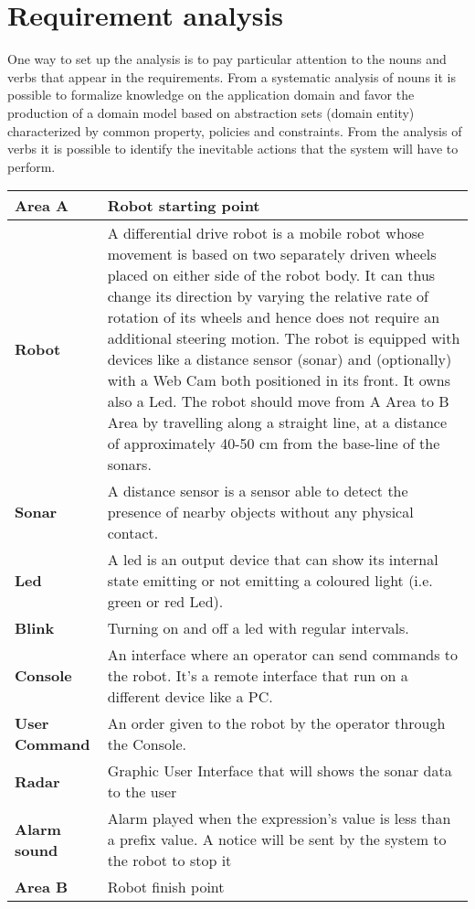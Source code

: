 \section{Requirement analysis}
One way to set up the analysis is to pay particular attention to the nouns and verbs that appear in the requirements. From a systematic analysis of nouns it is possible to formalize knowledge on the application domain and favor the production of a domain model based on abstraction sets (domain entity) characterized by common property, policies and constraints. From the analysis of verbs it is possible to identify the inevitable actions that the system will have to perform.
\begin{minipage}{\linewidth}
\centering
{} \label{tab:title} 
\end{minipage}
\begin{tabular}{| l | p{10cm} |}
\hline
\textbf{Area A} & Robot starting point \\ \hline
\textbf{Robot} & A differential drive robot is a mobile robot whose movement is based on two separately driven wheels placed on either side of the robot body. It can thus change its direction by varying the relative rate of rotation of its wheels and hence does not require an additional steering motion. The robot is equipped with devices like a distance sensor (sonar) and (optionally) with a Web Cam both positioned in its front. It owns also a Led. The robot should move from A Area to B Area by travelling along a straight line, at a distance of approximately 40-50 cm from the base-line of the sonars. \\ \hline
\textbf{Sonar} & A distance sensor is a sensor able to detect the presence of nearby objects without any physical contact. \\ \hline
\textbf{Led} & A led is an output device that can show its internal state emitting or not emitting a coloured light (i.e. green or red Led). \\ \hline
\textbf{Blink} & Turning on and off a led with regular intervals. \\ \hline
\textbf{Console} & An interface where an operator can send commands to the robot. It's a remote interface that run on a different device like a PC.\\ \hline
\textbf{User Command} & An order given to the robot by the operator through the Console. \\ \hline
\textbf{Radar} & Graphic User Interface that will shows the sonar data to the user \\ \hline
\textbf{Alarm sound} & Alarm played when the expression's value is less than a prefix value. A notice will be sent by the system to the robot to stop it\\ \hline
\textbf{Area B} & Robot finish point \\ \hline
\end{tabular}



